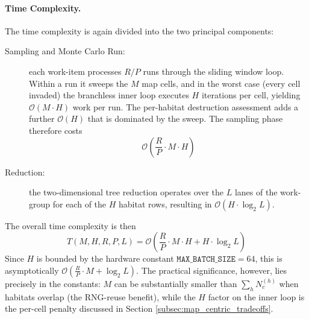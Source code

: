 \paragraph{Time Complexity.}
The time complexity is again divided into the two principal components:
\begin{description}
    \item[Sampling and Monte Carlo Run:] each work-item processes $R/P$ runs through the sliding window loop. Within a run it sweeps the $M$ map cells, and in the worst case (every cell invaded) the branchless inner loop executes $H$ iterations per cell, yielding $\mathcal{O}(M \cdot H)$ work per run. The per-habitat destruction assessment adds a further $\mathcal{O}(H)$ that is dominated by the sweep. The sampling phase therefore costs
    \[
    \mathcal{O}\left(\frac{R}{P} \cdot M \cdot H\right)
    \]
    \item[Reduction:] the two-dimensional tree reduction operates over the $L$ lanes of the work-group for each of the $H$ habitat rows, resulting in $\mathcal{O}(H \cdot \log_2 L)$.
\end{description}
\noindent
The overall time complexity is then
\begin{equation}
    T(M, H, R, P, L) = \mathcal{O}\left(\frac{R}{P} \cdot M \cdot H + H \cdot \log_2 L\right)
\label{eq:map_centric_kernel_time_complexity}
\end{equation}
Since $H$ is bounded by the hardware constant $\texttt{MAX\_BATCH\_SIZE} = 64$, this is asymptotically $\mathcal{O}\!\left(\frac{R}{P} \cdot M + \log_2 L\right)$. The practical significance, however, lies precisely in the constants: $M$ can be substantially smaller than $\sum_h N_c^{(h)}$ when habitats overlap (the RNG-reuse benefit), while the $H$ factor on the inner loop is the per-cell penalty discussed in Section \ref{subsec:map_centric_tradeoffs}.

